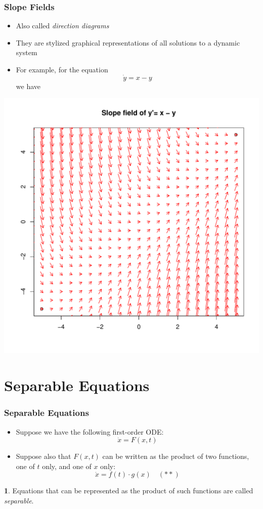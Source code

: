 \documentclass[10pt,usenames,dvipsnames]{beamer}
\theoremstyle{definition}
\newtheorem{definition}{\translate{Definition}}
\begin{document}
\begin{frame}[fragile]
\frametitle{Slope Fields}
\begin{itemize}
	\item Also called \textit{direction diagrams}
	\item They are stylized graphical representations of all solutions to a dynamic system
	\item For example, for the equation 
	\[
		\dot{y} = x - y 
	\]
	we have
\end{itemize}
\begin{center}
	\includegraphics[scale=0.3]{./graphs/fig1.pdf}
\end{center}

\end{frame}

\section{Separable Equations}
\begin{frame}[fragile]
\frametitle{Separable Equations}
\begin{itemize}
	\item Suppose we have the following first-order ODE:
	\[
		\dot{x} = F(x,t) 
	\]
	\item Suppose also that $F(x,t)$ can be written as the product of two functions, one of $t$ only, and one of $x$ only:
	\[
		\dot{x} = f(t)\cdot g(x)\quad (**)
	\]
\end{itemize}

\begin{definition}
	Equations that can be represented as the product of such functions are called \textit{separable}.
\end{definition}
\end{frame}
\end{document}
